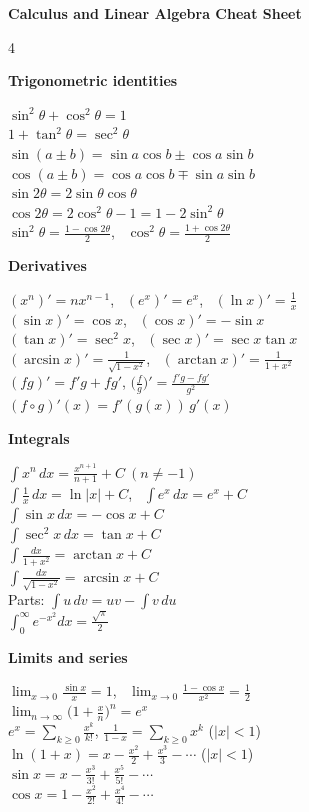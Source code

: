 \documentclass[9pt]{extarticle}
\newcommand{\block}[1]{\par\vspace{2pt}\colorbox{accent!10}{\parbox{\dimexpr\linewidth-2\fboxsep}{\bfseries\color{accent}#1}}\par\vspace{1pt}}
\begin{document}
\begin{center}
  {\large\bfseries\color{accent} Calculus and Linear Algebra Cheat Sheet}
\end{center}
\vspace{-4pt}

\begin{multicols}{4}
\footnotesize

\block{Trigonometric identities}
$\sin^2\theta + \cos^2\theta = 1$\\
$1 + \tan^2\theta = \sec^2\theta$\\
$\sin(a \pm b) = \sin a\cos b \pm \cos a\sin b$\\
$\cos(a \pm b) = \cos a\cos b \mp \sin a\sin b$\\
$\sin 2\theta = 2\sin\theta\cos\theta$\\
$\cos 2\theta = 2\cos^2\theta - 1 = 1 - 2\sin^2\theta$\\
$\sin^2\theta = \tfrac{1 - \cos 2\theta}{2}$, \ $\cos^2\theta = \tfrac{1 + \cos 2\theta}{2}$

\block{Derivatives}
$(x^n)' = nx^{n-1}$, \ $(e^{x})' = e^{x}$, \ $(\ln x)' = \tfrac1x$\\
$(\sin x)' = \cos x$, \ $(\cos x)' = -\sin x$\\
$(\tan x)' = \sec^2 x$, \ $(\sec x)' = \sec x\tan x$\\
$(\arcsin x)' = \tfrac{1}{\sqrt{1-x^2}}$, \ $(\arctan x)' = \tfrac{1}{1+x^2}$\\
$(fg)' = f'g + fg'$, \quad $\bigl(\tfrac{f}{g}\bigr)' = \tfrac{f'g - fg'}{g^2}$\\
$(f\circ g)'(x) = f'(g(x))\,g'(x)$

\block{Integrals}
$\int x^n\,dx = \tfrac{x^{n+1}}{n+1} + C \ (n \neq -1)$\\
$\int \tfrac{1}{x}\,dx = \ln|x| + C$, \ $\int e^{x}\,dx = e^{x} + C$\\
$\int \sin x\,dx = -\cos x + C$\\
$\int \sec^2 x\,dx = \tan x + C$\\
$\int \tfrac{dx}{1+x^2} = \arctan x + C$\\
$\int \tfrac{dx}{\sqrt{1-x^2}} = \arcsin x + C$\\
Parts: $\int u\,dv = uv - \int v\,du$\\
$\int_0^\infty e^{-x^2}dx = \tfrac{\sqrt{\pi}}{2}$

\block{Limits and series}
$\lim_{x\to 0}\tfrac{\sin x}{x} = 1$, \ $\lim_{x\to 0}\tfrac{1-\cos x}{x^2} = \tfrac12$\\
$\lim_{n\to\infty}\bigl(1 + \tfrac{x}{n}\bigr)^n = e^{x}$\\
$e^{x} = \sum_{k\ge 0} \tfrac{x^k}{k!}$, \quad
$\tfrac{1}{1-x} = \sum_{k\ge 0} x^k$ ($|x|<1$)\\
$\ln(1+x) = x - \tfrac{x^2}{2} + \tfrac{x^3}{3} - \cdots$ ($|x|<1$)\\
$\sin x = x - \tfrac{x^3}{3!} + \tfrac{x^5}{5!} - \cdots$\\
$\cos x = 1 - \tfrac{x^2}{2!} + \tfrac{x^4}{4!} - \cdots$


\end{multicols}
\end{document}
